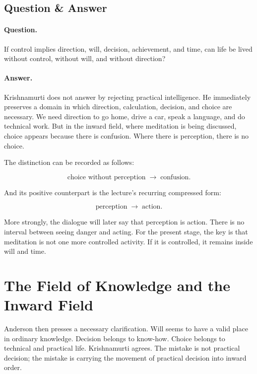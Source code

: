 \subsection{Question \& Answer}

\paragraph{Question.}
If control implies direction, will, decision, achievement, and time, can life be lived without control, without will, and without direction?

\paragraph{Answer.}
Krishnamurti does not answer by rejecting practical intelligence. He immediately preserves a domain in which direction, calculation, decision, and choice are necessary. We need direction to go home, drive a car, speak a language, and do technical work. But in the inward field, where meditation is being discussed, choice appears because there is confusion. Where there is perception, there is no choice.

The distinction can be recorded as follows:

\begin{equation}
\text{choice without perception}
\;\longrightarrow\;
\text{confusion}.
\end{equation}

And its positive counterpart is the lecture's recurring compressed form:

\begin{equation}
\text{perception}
\;\longrightarrow\;
\text{action}.
\end{equation}

More strongly, the dialogue will later say that perception is action. There is no interval between seeing danger and acting. For the present stage, the key is that meditation is not one more controlled activity. If it is controlled, it remains inside will and time.

\section{The Field of Knowledge and the Inward Field}

Anderson then presses a necessary clarification. Will seems to have a valid place in ordinary knowledge. Decision belongs to know-how. Choice belongs to technical and practical life. Krishnamurti agrees. The mistake is not practical decision; the mistake is carrying the movement of practical decision into inward order.


